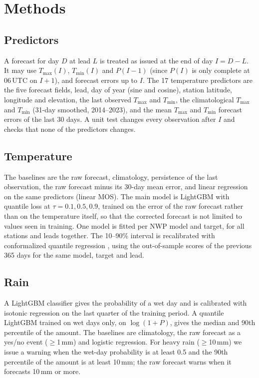 \documentclass{article}
\begin{document}
\section{Methods}
\label{sec:methods}

\subsection{Predictors}
A forecast for day $D$ at lead $L$ is treated as issued at the end of day $I=D-L$. It may use $T_{\max}(I)$, $T_{\min}(I)$ and $P(I-1)$ (since $P(I)$ is only complete at 06\,UTC on $I{+}1$), and forecast errors up to $I$. The 17 temperature predictors are the five forecast fields, lead, day of year (sine and cosine), station latitude, longitude and elevation, the last observed $T_{\max}$ and $T_{\min}$, the climatological $T_{\max}$ and $T_{\min}$ (31-day smoothed, 2014--2023), and the mean $T_{\max}$ and $T_{\min}$ forecast errors of the last 30 days. A unit test changes every observation after $I$ and checks that none of the predictors changes.

\subsection{Temperature}
The baselines are the raw forecast, climatology, persistence of the last observation, the raw forecast minus its 30-day mean error, and linear regression on the same predictors (linear MOS). The main model is LightGBM \citep{ke2017lightgbm} with quantile loss at $\tau=0.1, 0.5, 0.9$, trained on the error of the raw forecast rather than on the temperature itself, so that the corrected forecast is not limited to values seen in training. One model is fitted per NWP model and target, for all stations and leads together. The 10--90\% interval is recalibrated with conformalized quantile regression \citep{romano2019cqr}, using the out-of-sample scores of the previous 365 days for the same model, target and lead.

\subsection{Rain}
A LightGBM classifier gives the probability of a wet day and is calibrated with isotonic regression on the last quarter of the training period. A quantile LightGBM trained on wet days only, on $\log(1+P)$, gives the median and 90th percentile of the amount. The baselines are climatology, the raw forecast as a yes/no event ($\ge$1\,mm) and logistic regression. For heavy rain ($\ge$10\,mm) we issue a warning when the wet-day probability is at least 0.5 and the 90th percentile of the amount is at least 10\,mm; the raw forecast warns when it forecasts 10\,mm or more.
\end{document}
